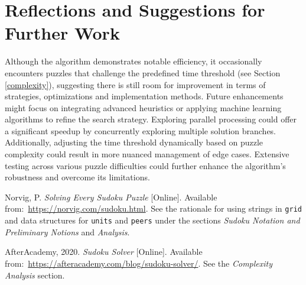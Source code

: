 \documentclass[12pt]{article}
\begin{document}
\section{Reflections and Suggestions for Further Work}
\label{future}

Although the algorithm demonstrates notable efficiency, it occasionally
encounters puzzles that challenge the predefined time threshold (see Section
\ref{complexity}), suggesting there is still room for improvement in terms of
strategies, optimizations and implementation methods. Future enhancements might
focus on integrating advanced heuristics or applying machine learning
algorithms to refine the search strategy. Exploring parallel processing could
offer a significant speedup by concurrently exploring multiple solution
branches. Additionally, adjusting the time threshold dynamically based on
puzzle complexity could result in more nuanced management of edge cases.
Extensive testing across various puzzle difficulties could further enhance the
algorithm's robustness and overcome its limitations.

\begin{thebibliography}{9}

     Norvig, P. \textit{Solving Every Sudoku Puzzle} [Online].
    Available from:~\url{https://norvig.com/sudoku.html}. See the rationale for
    using strings in \texttt{grid} and data structures for \texttt{units} and
    \texttt{peers} under the sections \textit{Sudoku Notation and Preliminary
    Notions} and \textit{Analysis}.

     AfterAcademy, 2020. \textit{Sudoku Solver} [Online].
    Available from:~\url{https://afteracademy.com/blog/sudoku-solver/}. See the
    \textit{Complexity Analysis} section.

\end{thebibliography}
\end{document}

